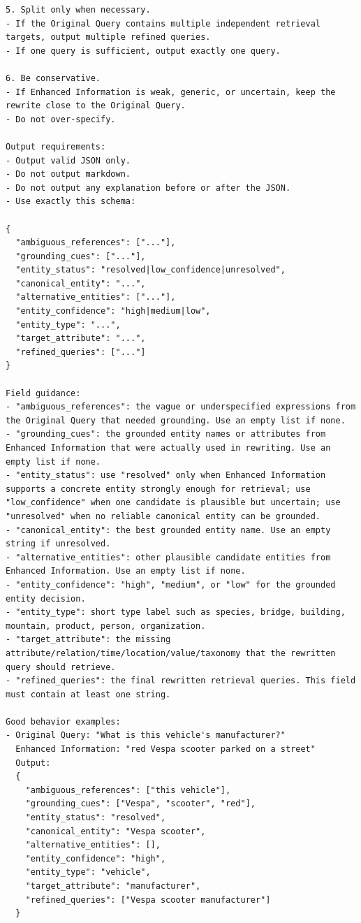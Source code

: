 \begin{verbatim}
5. Split only when necessary.
- If the Original Query contains multiple independent retrieval targets, output multiple refined queries.
- If one query is sufficient, output exactly one query.

6. Be conservative.
- If Enhanced Information is weak, generic, or uncertain, keep the rewrite close to the Original Query.
- Do not over-specify.

Output requirements:
- Output valid JSON only.
- Do not output markdown.
- Do not output any explanation before or after the JSON.
- Use exactly this schema:

{
  "ambiguous_references": ["..."],
  "grounding_cues": ["..."],
  "entity_status": "resolved|low_confidence|unresolved",
  "canonical_entity": "...",
  "alternative_entities": ["..."],
  "entity_confidence": "high|medium|low",
  "entity_type": "...",
  "target_attribute": "...",
  "refined_queries": ["..."]
}

Field guidance:
- "ambiguous_references": the vague or underspecified expressions from the Original Query that needed grounding. Use an empty list if none.
- "grounding_cues": the grounded entity names or attributes from Enhanced Information that were actually used in rewriting. Use an empty list if none.
- "entity_status": use "resolved" only when Enhanced Information supports a concrete entity strongly enough for retrieval; use "low_confidence" when one candidate is plausible but uncertain; use "unresolved" when no reliable canonical entity can be grounded.
- "canonical_entity": the best grounded entity name. Use an empty string if unresolved.
- "alternative_entities": other plausible candidate entities from Enhanced Information. Use an empty list if none.
- "entity_confidence": "high", "medium", or "low" for the grounded entity decision.
- "entity_type": short type label such as species, bridge, building, mountain, product, person, organization.
- "target_attribute": the missing attribute/relation/time/location/value/taxonomy that the rewritten query should retrieve.
- "refined_queries": the final rewritten retrieval queries. This field must contain at least one string.

Good behavior examples:
- Original Query: "What is this vehicle's manufacturer?"
  Enhanced Information: "red Vespa scooter parked on a street"
  Output:
  {
    "ambiguous_references": ["this vehicle"],
    "grounding_cues": ["Vespa", "scooter", "red"],
    "entity_status": "resolved",
    "canonical_entity": "Vespa scooter",
    "alternative_entities": [],
    "entity_confidence": "high",
    "entity_type": "vehicle",
    "target_attribute": "manufacturer",
    "refined_queries": ["Vespa scooter manufacturer"]
  }


\end{verbatim}

